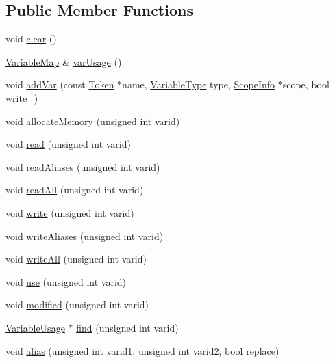 \subsection*{Public Member Functions}
\begin{DoxyCompactItemize}
\item 
void \hyperlink{class_variables_a46c30050683017ad2e4089a0970eb2a8}{clear} ()
\item 
\hyperlink{class_variables_ad1842b533d8aea619d93eb5d571e35d0}{Variable\-Map} \& \hyperlink{class_variables_a80d0dd3e7539743bfe0cb65906ab54ad}{var\-Usage} ()
\item 
void \hyperlink{class_variables_ac1f2b1f8230118f9c376ec7b86cdc1b2}{add\-Var} (const \hyperlink{class_token}{Token} $\ast$name, \hyperlink{class_variables_a1ce977f31f855a0966511a93b9deb9b6}{Variable\-Type} type, \hyperlink{class_scope_info}{Scope\-Info} $\ast$scope, bool write\-\_\-)
\item 
void \hyperlink{class_variables_a5a93b5a3558b8f65747ff749c633a757}{allocate\-Memory} (unsigned int varid)
\item 
void \hyperlink{class_variables_ab88a423ae0e238a45ecbdf6f2f21f524}{read} (unsigned int varid)
\item 
void \hyperlink{class_variables_a130e9c0c81697462c7a4599bb501c76d}{read\-Aliases} (unsigned int varid)
\item 
void \hyperlink{class_variables_a37ce07da83cad11a23283211781f480c}{read\-All} (unsigned int varid)
\item 
void \hyperlink{class_variables_a8998a3dfc5cd4e073b67b314c92f59f3}{write} (unsigned int varid)
\item 
void \hyperlink{class_variables_a8216a64a5fba3f0670e56e1321016119}{write\-Aliases} (unsigned int varid)
\item 
void \hyperlink{class_variables_a1d96362c64e76fb698cc855266be4e9a}{write\-All} (unsigned int varid)
\item 
void \hyperlink{class_variables_afcc3acc3af2c1c02f3c9d4668a7f6272}{use} (unsigned int varid)
\item 
void \hyperlink{class_variables_a1c4d49dba6f320283d1b068daad65ba2}{modified} (unsigned int varid)
\item 
\hyperlink{class_variables_1_1_variable_usage}{Variable\-Usage} $\ast$ \hyperlink{class_variables_af8d45c4c9e9072bf848cc37d57243081}{find} (unsigned int varid)
\item 
void \hyperlink{class_variables_a459bf7f3ba16d1b0e127b283579559c7}{alias} (unsigned int varid1, unsigned int varid2, bool replace)

\end{DoxyCompactItemize}
